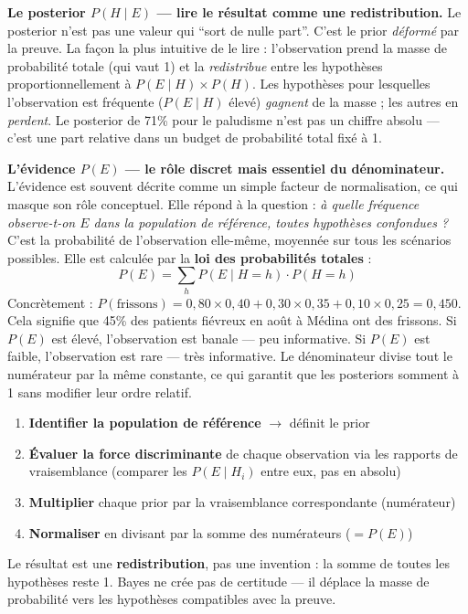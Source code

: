 \documentclass[11pt,a4paper]{article}
\begin{document}
\textbf{Le posterior $P(H \mid E)$ — lire le résultat comme une redistribution.}
Le posterior n'est pas une valeur qui ``sort de nulle part''. C'est le prior \textit{déformé} par la preuve. La façon la plus intuitive de le lire : l'observation prend la masse de probabilité totale (qui vaut 1) et la \textit{redistribue} entre les hypothèses proportionnellement à $P(E \mid H) \times P(H)$. Les hypothèses pour lesquelles l'observation est fréquente ($P(E \mid H)$ élevé) \textit{gagnent} de la masse ; les autres en \textit{perdent}. Le posterior de 71\% pour le paludisme n'est pas un chiffre absolu — c'est une part relative dans un budget de probabilité total fixé à 1.

\textbf{L'évidence $P(E)$ — le rôle discret mais essentiel du dénominateur.}
L'évidence est souvent décrite comme un simple facteur de normalisation, ce qui masque son rôle conceptuel. Elle répond à la question : \textit{à quelle fréquence observe-t-on $E$ dans la population de référence, toutes hypothèses confondues ?} C'est la probabilité de l'observation elle-même, moyennée sur tous les scénarios possibles. Elle est calculée par la \textbf{loi des probabilités totales} :
$$P(E) = \sum_{h} P(E \mid H = h) \cdot P(H = h)$$
Concrètement : $P(\text{frissons}) = 0{,}80 \times 0{,}40 + 0{,}30 \times 0{,}35 + 0{,}10 \times 0{,}25 = 0{,}450$. Cela signifie que 45\% des patients fiévreux en août à Médina ont des frissons. Si $P(E)$ est élevé, l'observation est banale — peu informative. Si $P(E)$ est faible, l'observation est rare — très informative. Le dénominateur divise tout le numérateur par la même constante, ce qui garantit que les posteriors somment à 1 sans modifier leur ordre relatif.

\begin{attentionbox}
\begin{enumerate}[nosep]
    \item \textbf{Identifier la population de référence} $\to$ définit le prior
    \item \textbf{Évaluer la force discriminante} de chaque observation via les rapports de vraisemblance (comparer les $P(E \mid H_i)$ entre eux, pas en absolu)
    \item \textbf{Multiplier} chaque prior par la vraisemblance correspondante (numérateur)
    \item \textbf{Normaliser} en divisant par la somme des numérateurs ($= P(E)$)
\end{enumerate}

Le résultat est une \textbf{redistribution}, pas une invention : la somme de toutes les hypothèses reste 1. Bayes ne crée pas de certitude — il déplace la masse de probabilité vers les hypothèses compatibles avec la preuve.
\end{attentionbox}
\end{document}
